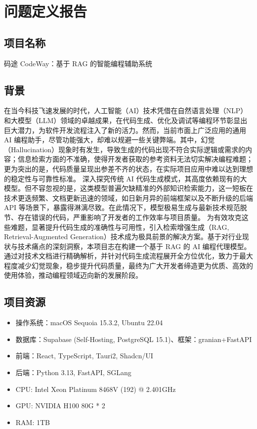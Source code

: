 \documentclass[
    report,     %
    oneside,    %
    UTF8,       %
    zihao=-4    %
]{config} %
\begin{document}

\SetArabicPageNumber{} %


\chapter{问题定义报告}

\section{项目名称}
码途 CodeWay：基于 RAG 的智能编程辅助系统
\section{背景}
在当今科技飞速发展的时代，人工智能（AI）技术凭借在自然语言处理（NLP）和大模型（LLM）领域的卓越成果，在代码生成、优化及调试等编程环节彰显出巨大潜力，为软件开发流程注入了新的活力。然而，当前市面上广泛应用的通用 AI 编程助手，尽管功能强大，却难以规避一些关键弊端。其中，幻觉（Hallucination）现象时有发生，导致生成的代码出现不符合实际逻辑或需求的内容；信息检索方面的不准确，使得开发者获取的参考资料无法切实解决编程难题；更为突出的是，代码质量呈现出参差不齐的状态，在实际项目应用中难以达到理想的稳定性与可靠性标准。
深入探究传统 AI 代码生成模式，其高度依赖现有的大模型。但不容忽视的是，这类模型普遍欠缺精准的外部知识检索能力，这一短板在技术更迭频繁、文档更新迅速的领域，如日新月异的前端框架以及不断升级的后端 API 等场景下，暴露得淋漓尽致。在此情况下，模型极易生成与最新技术规范脱节、存在错误的代码，严重影响了开发者的工作效率与项目质量。
为有效攻克这些难题，显著提升代码生成的准确性与可用性，引入检索增强生成（RAG, Retrieval-Augmented Generation）技术成为极具前景的解决方案。基于对行业现状与技术痛点的深刻洞察，本项目志在构建一个基于 RAG 的 AI 编程代理模型。通过对技术文档进行精确解析，并针对代码生成流程展开全方位优化，致力于最大程度减少幻觉现象，稳步提升代码质量，最终为广大开发者缔造更为优质、高效的使用体验，推动编程领域迈向新的发展阶段。

\section{项目资源}
\begin{itemize}
    \item 操作系统：macOS Sequoia 15.3.2, Ubuntu 22.04
    \item 数据库：Supabase (Self-Hosting, PostgreSQL 15.1)、框架：granian+FastAPI
    \item 前端：React, TypeScript, Tauri2, Shadcn/UI
    \item 后端：Python 3.13, FastAPI, SGLang
    \item CPU: Intel Xeon Platinum 8468V (192) @ 2.401GHz
    \item GPU: NVIDIA H100 80G * 2
    \item RAM: 1TB
\end{itemize}
\end{document}
